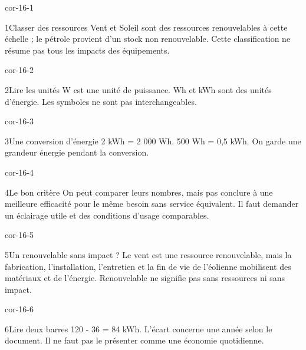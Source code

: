 \documentclass[12pt,twoside,openany]{book}
\begin{document}
\clearpage{}
\begin{blocLivre}{cor-16-1}
\begin{corrige}{1}{Classer des ressources}
Vent et Soleil sont des ressources renouvelables à cette échelle ; le pétrole provient d’un stock non renouvelable. Cette classification ne résume pas tous les impacts des équipements.\par
\end{corrige}\end{blocLivre}
\begin{blocLivre}{cor-16-2}
\begin{corrige}{2}{Lire les unités}
W est une unité de puissance. Wh et kWh sont des unités d’énergie. Les symboles ne sont pas interchangeables.\par
\end{corrige}\end{blocLivre}
\begin{blocLivre}{cor-16-3}
\begin{corrige}{3}{Une conversion d’énergie}
2 kWh = 2 000 Wh. 500 Wh = 0,5 kWh. On garde une grandeur énergie pendant la conversion.\par
\end{corrige}\end{blocLivre}
\begin{blocLivre}{cor-16-4}
\begin{corrige}{4}{Le bon critère}
On peut comparer leurs nombres, mais pas conclure à une meilleure efficacité pour le même besoin sans service équivalent. Il faut demander un éclairage utile et des conditions d’usage comparables.\par
\end{corrige}\end{blocLivre}
\begin{blocLivre}{cor-16-5}
\begin{corrige}{5}{Un renouvelable sans impact ?}
Le vent est une ressource renouvelable, mais la fabrication, l’installation, l’entretien et la fin de vie de l’éolienne mobilisent des matériaux et de l’énergie. Renouvelable ne signifie pas sans ressources ni sans impact.\par
\end{corrige}\end{blocLivre}
\begin{blocLivre}{cor-16-6}
\begin{corrige}{6}{Lire deux barres}
120 - 36 = 84 kWh. L’écart concerne une année selon le document. Il ne faut pas le présenter comme une économie quotidienne.\par
\end{corrige}\end{blocLivre}
\end{document}
